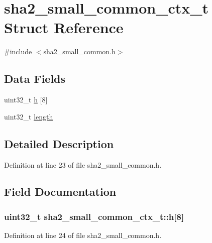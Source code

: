 \hypertarget{structsha2__small__common__ctx__t}{\section{sha2\-\_\-small\-\_\-common\-\_\-ctx\-\_\-t Struct Reference}
\label{structsha2__small__common__ctx__t}
}


{\ttfamily \#include $<$sha2\-\_\-small\-\_\-common.\-h$>$}

\subsection*{Data Fields}
\begin{DoxyCompactItemize}
\item 
uint32\-\_\-t \hyperlink{structsha2__small__common__ctx__t_a0245422307669515fbeb797fafa272a9}{h} \mbox{[}8\mbox{]}
\item 
uint32\-\_\-t \hyperlink{structsha2__small__common__ctx__t_aa866ef6a2ab6cfe438eb41cc3828c9b8}{length}
\end{DoxyCompactItemize}


\subsection{Detailed Description}


Definition at line 23 of file sha2\-\_\-small\-\_\-common.\-h.



\subsection{Field Documentation}
\hypertarget{structsha2__small__common__ctx__t_a0245422307669515fbeb797fafa272a9}{
\subsubsection[{h}]{\setlength{\rightskip}{0pt plus 5cm}uint32\-\_\-t sha2\-\_\-small\-\_\-common\-\_\-ctx\-\_\-t\-::h\mbox{[}8\mbox{]}}}\label{structsha2__small__common__ctx__t_a0245422307669515fbeb797fafa272a9}


Definition at line 24 of file sha2\-\_\-small\-\_\-common.\-h.



